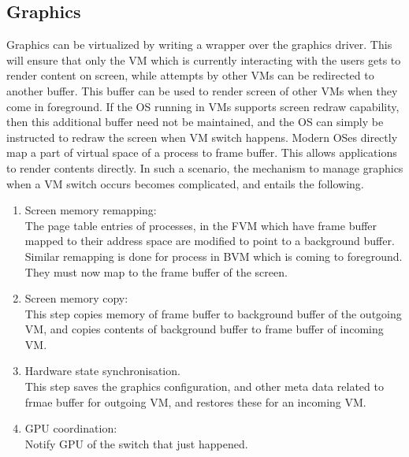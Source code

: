 \documentclass[seminar,twoside]{iitbreport}
\begin{document}
 \subsection*{Graphics} 
 Graphics can be virtualized by writing a wrapper over the graphics driver. This will ensure that only the VM which is currently interacting with the users gets to render content
 on screen, while attempts by other VMs can be redirected to another buffer. This buffer can be used to render screen of other VMs when they come in foreground. If the OS
 running in VMs supports screen redraw capability, then this additional buffer need not be maintained, and the OS can simply be instructed to redraw the screen when VM switch
 happens. Modern OSes directly map a part of virtual space of a process to frame buffer. This allows applications to render contents directly. In such a scenario, the mechanism
 to manage graphics when a VM switch occurs becomes complicated, and entails the following.
 \begin{enumerate}
  \item Screen memory remapping: \\
  The page table entries of processes, in the FVM which have frame buffer mapped to their address space are modified to point to a background buffer. Similar remapping
  is done for process in BVM which is coming to foreground. They must now map to the frame buffer of the screen.
  \item Screen memory copy:\\
  This step copies memory of frame buffer to background buffer of the outgoing VM, and copies contents of background buffer to frame buffer of incoming VM.
  \item Hardware state synchronisation.\\
  This step saves the graphics configuration, and other meta data related to frmae buffer for outgoing VM, and restores these for an incoming VM.
  \item GPU coordination: \\
  Notify GPU of the switch that just happened.
 \end{enumerate}

 
\end{document}

